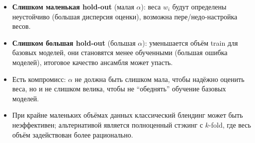 \begin{itemize}
    \item \textbf{Слишком маленькая hold-out} (малая $\alpha$): веса $w_i$ будут определены неустойчиво (большая дисперсия оценки), возможна пере/недо-настройка весов.  
    \item \textbf{Слишком большая hold-out} (большая $\alpha$): уменьшается объём train для базовых моделей, они становятся менее обученными (большая ошибка моделей), итоговое качество ансамбля может упасть.
    \item Есть компромисс: $\alpha$ не должна быть слишком мала, чтобы надёжно оценить веса, но и не слишком велика, чтобы не ``обеднять'' обучение базовых моделей.
    \item При крайне маленьких объёмах данных классический блендинг может быть неэффективен; альтернативой является полноценный стэкинг с $k$-fold, где весь объём задействован более рационально.
\end{itemize}
